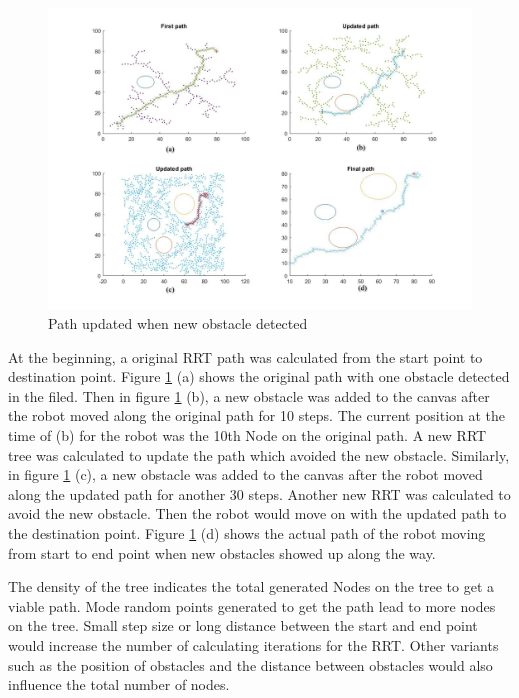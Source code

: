 \documentclass[
  oneside]{ubcthesis}
\begin{document}
\begin{figure}

{\centering \includegraphics[width=0.9\linewidth]{figures/2-1} 

}

\caption{Path updated when new obstacle detected}\label{fig:figure2}
\end{figure}



At the beginning, a original RRT path was calculated from the start point to destination point. Figure \ref{fig:figure2} (a) shows the original path with one obstacle detected in the filed. Then in figure \ref{fig:figure2} (b), a new obstacle was added to the canvas after the robot moved along the original path for 10 steps. The current position at the time of (b) for the robot was the 10th Node on the original path. A new RRT tree was calculated to update the path which avoided the new obstacle. Similarly, in figure \ref{fig:figure2} (c), a new obstacle was added to the canvas after the robot moved along the updated path for another 30 steps. Another new RRT was calculated to avoid the new obstacle. Then the robot would move on with the updated path to the destination point. Figure \ref{fig:figure2} (d) shows the actual path of the robot moving from start to end point when new obstacles showed up along the way.

The density of the tree indicates the total generated Nodes on the tree to get a viable path. Mode random points generated to get the path lead to more nodes on the tree. Small step size or long distance between the start and end point would increase the number of calculating iterations for the RRT. Other variants such as the position of obstacles and the distance between obstacles would also influence the total number of nodes.
\end{document}
